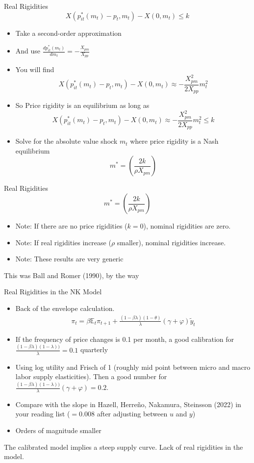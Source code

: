 \documentclass[11pt,aspectratio=169,xcolor={dvipsnames},hyperref={pdftex,pdfpagemode=UseNone,hidelinks,pdfdisplaydoctitle=true},usepdftitle=false]{beamer}
\begin{document}
\begin{frame}{Real Rigidities}
$$X(p^*_{it}(m_t) - p_t,m_t) - X(0,m_t) \leq k$$
\begin{itemize}
\item Take a second-order approximation
\item And use $\frac{dp^*_{it}(m_t)}{dm_t} = -\frac{X_{pm}}{X_{pp}} $
\item You will find
$$ X(p^*_{it}(m_t) - p_t,m_t) - X(0,m_t) \approx - \frac{X_{pm}^2}{2 X_{pp}} m_t^2$$
\item So Price rigidity is an equilibrium as long as
$$ X(p^*_{it}(m_t) - p_t,m_t) - X(0,m_t) \approx - \frac{X_{pm}^2}{2 X_{pp}} m_t^2 \leq k$$
\item Solve for the absolute value shock  $m_t$ where price rigidity is a Nash equilibrium
$$m^* = \left(\frac{2 k}{\rho X_{pm}}\right)$$
\end{itemize}
\end{frame}



\begin{frame}{Real Rigidities}
$$m^* = \left(\frac{2 k}{\rho X_{pm}}\right)$$
\begin{itemize}
\item Note: If there are no price rigidities ($k = 0$), nominal rigidities are zero.
\item Note: If real rigidities increase ($\rho$ smaller), nominal rigidities increase.
\item Note: These results are very generic
\end{itemize}
This was Ball and Romer (1990), by the way
\end{frame}

\begin{frame}{Real Rigidities in the NK Model}
\begin{itemize}
\item Back of the envelope calculation.
\begin{align*}
\pi_t = \beta \mathbb{E}_t \pi_{t+1} + \frac{(1-\beta \lambda)(1-\theta)}{\lambda} (\gamma + \varphi) \tilde{y}_t
\end{align*}
\item If the frequency of price changes is 0.1 per month, a good calibration for $ \frac{(1-\beta \lambda)(1-\lambda))}{\lambda} = 0.1$ quarterly
\item Using log utility and Frisch of 1 (roughly mid point between micro and macro labor supply elasticities). Then a good number for $ \frac{(1-\beta \lambda)(1-\lambda))}{\lambda} (\gamma + \varphi) = 0.2$. 
\item Compare with the slope in Hazell, Herre\~no, Nakamura, Steinsson (2022) in your reading list ($= 0.008$ after adjusting between $u$ and $y$)
\item Orders of magnitude smaller
\end{itemize}
The calibrated model implies a steep supply curve. Lack of real rigidities in the model.
\end{frame}
\end{document}
